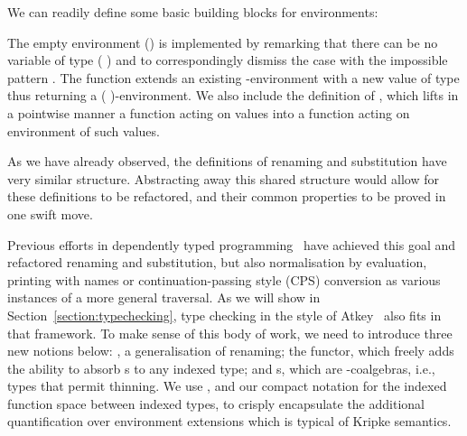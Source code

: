 We can readily define some basic building blocks for environments:

\noindent
\begin{minipage}{0.99\textwidth}
  \centering
  \begin{minipage}[t]{0.3\textwidth}
  \end{minipage}
  \begin{minipage}[t]{0.69\textwidth}
  \end{minipage}
\end{minipage}
\begin{agdasnippet}
\end{agdasnippet}
The empty environment () is implemented
by remarking that there can be no variable of type
{(  \AIC{[]})} and to correspondingly dismiss the case with
the impossible pattern \AS{()}. The function  extends an existing
-environment with a new value of type  thus returning a
{(  )}-environment. We also include the definition
of \AF{\_<\$>\_}, which lifts in a pointwise manner a function acting
on values into a function acting on environment of such values.

As we have already observed, the definitions of renaming and substitution have very
similar structure. Abstracting away this shared structure would allow for these
definitions to be refactored, and their common properties to be proved in one swift
move.

Previous efforts in dependently typed
programming~\cite{benton2012strongly,allais2017type}
have achieved this goal and refactored renaming and substitution,
but also normalisation by evaluation, printing with names or continuation-passing style (CPS) conversion
as various instances of a more general traversal. As we will show in Section~\ref{section:typechecking},
type checking in the style of Atkey~\citeyear{atkey2015algebraic} also
fits in that framework. To make sense of this body of work, we
need to introduce three new notions below: , a generalisation of
renaming; the
 functor, which freely adds the ability to absorb s to any indexed type; and s, which are -coalgebras, i.e., types that permit thinning.
We use , and our compact notation for the indexed function space
between indexed types, to crisply encapsulate the additional quantification
over environment extensions which is typical of Kripke semantics.


